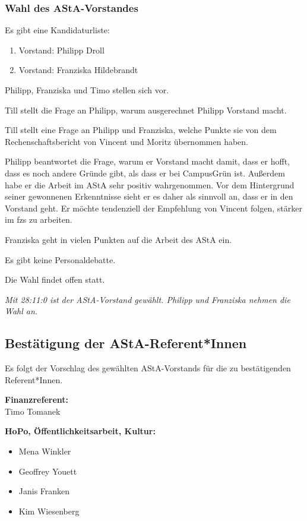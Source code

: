 \documentclass[ngerman,headheight=70pt]{scrartcl}
\begin{document}
    \subsubsection{Wahl des AStA-Vorstandes}

    Es gibt eine Kandidaturliste:

    \begin{enumerate}
        \item Vorstand: Philipp Droll
        \item Vorstand: Franziska Hildebrandt
    \end{enumerate}

    Philipp, Franziska und Timo stellen sich vor.

    Till stellt die Frage an Philipp, warum ausgerechnet
    Philipp Vorstand macht.

    Till stellt eine Frage an Philipp und Franziska, welche Punkte sie
    von dem Rechenschaftsbericht von Vincent und Moritz übernommen haben.

    Philipp beantwortet die Frage, warum er Vorstand macht damit, dass
    er hofft, dass es noch andere Gründe gibt, als dass er bei CampusGrün ist.
    Außerdem habe er die Arbeit im AStA sehr positiv wahrgenommen. Vor dem
    Hintergrund seiner gewonnenen Erkenntnisse sieht er es daher als sinnvoll an,
    dass er in den Vorstand geht. Er möchte tendenziell der Empfehlung von Vincent
    folgen, stärker im fzs zu arbeiten.

    Franziska geht in vielen Punkten auf die Arbeit des AStA ein.

    Es gibt keine Personaldebatte.

    Die Wahl findet offen statt.

    \textit{Mit 28:11:0 ist der AStA-Vorstand gewählt. Philipp und Franziska nehmen
    die Wahl an.}

    \subsection{Bestätigung der AStA-Referent*Innen}

    Es folgt der Vorschlag des gewählten AStA-Vorstands für die zu bestätigenden
    Referent*Innen.

    \textbf{Finanzreferent:}\\
    Timo Tomanek

    \textbf{HoPo, Öffentlichkeitsarbeit, Kultur:}
    \begin{itemize}
        \item Mena Winkler
        \item Geoffrey Youett
        \item Janis Franken
        \item Kim Wiesenberg
    \end{itemize}
\end{document}
